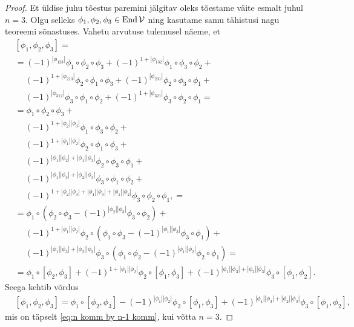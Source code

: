 \begin{proof}
    Et üldise juhu tõestus paremini jälgitav oleks tõestame väite
    esmalt juhul $n=3$. Olgu selleks
    $\phi_1, \phi_2, \phi_3 \in \operatorname{End} \mathcal{V}$ ning kasutame samu
    tähistusi nagu teoreemi sõnastuses. Vahetu arvutuse tulemusel
    näeme, et
    \begin{align*}
        &[\phi_1, \phi_2, \phi_3] = \\
        &= (-1)^{|\phi_{123}|} \phi_1 \circ \phi_2 \circ \phi_3 +
        (-1)^{1 + |\phi_{132}|} \phi_1 \circ \phi_3 \circ \phi_2 + \\
        &\ \quad (-1)^{1 + |\phi_{213}|}
            \phi_2 \circ \phi_1 \circ \phi_3 +
        (-1)^{|\phi_{231}|} \phi_2 \circ \phi_3 \circ \phi_1 + \\
        &\ \quad (-1)^{|\phi_{312}|} \phi_3 \circ \phi_1 \circ \phi_2 +
        (-1)^{1 + |\phi_{321}|} \phi_3 \circ \phi_2 \circ \phi_1 = \\
        &= \phi_1 \circ \phi_2 \circ \phi_3 + \\
        &\ \quad (-1)^{1 + |\phi_2||\phi_3|}
            \phi_1 \circ \phi_3 \circ \phi_2 + \\
        &\ \quad (-1)^{1 + |\phi_1||\phi_2|}
            \phi_2 \circ \phi_1 \circ \phi_3 + \\
        &\ \quad (-1)^{|\phi_1||\phi_2|+|\phi_1||\phi_3|}
            \phi_2 \circ \phi_3 \circ \phi_1 + \\
        &\ \quad (-1)^{|\phi_1||\phi_3|+|\phi_2||\phi_3|}
            \phi_3 \circ \phi_1 \circ \phi_2 + \\
        &\ \quad (-1)^{
                1 + |\phi_2||\phi_3|+|\phi_1||\phi_3|+|\phi_1||\phi_2|
            } \phi_3 \circ \phi_2 \circ \phi_1, = \\
        &= \phi_1 \circ \left(
            \phi_2 \circ \phi_3 -
            (-1)^{|\phi_2||\phi_3|} \phi_3 \circ \phi_2
        \right) + \\
        &\ \quad (-1)^{1 + |\phi_1||\phi_2|} \phi_2 \circ \left(
            \phi_1 \circ \phi_3 -
            (-1)^{|\phi_1||\phi_3|} \phi_3 \circ \phi_1
        \right) + \\
        &\ \quad (-1)^{|\phi_1||\phi_3|+|\phi_2||\phi_3|} \phi_3 \circ
        \left(
            \phi_1 \circ \phi_2 -
            (-1)^{|\phi_1||\phi_2|} \phi_2 \circ \phi_1
        \right) = \\
        &= \phi_1 \circ [\phi_2, \phi_3] +
            (-1)^{1 + |\phi_1||\phi_2|} \phi_2 \circ [\phi_1, \phi_3] +
            (-1)^{|\phi_1||\phi_3|+|\phi_2||\phi_3|} \phi_3 \circ [\phi_1, \phi_2].
    \end{align*}
    Seega kehtib võrdus
    \begin{align*}
        &[\phi_1, \phi_2, \phi_3] =
        \phi_1 \circ [\phi_2, \phi_3] -
        (-1)^{|\phi_1||\phi_2|} \phi_2 \circ [\phi_1, \phi_3] +
        (-1)^{|\phi_1||\phi_3| + |\phi_2||\phi_3|}
            \phi_3 \circ [\phi_1, \phi_2],
    \end{align*}
    mis on täpselt \eqref{eq:n komm by n-1 komm}, kui võtta $n = 3$.


\end{proof}
